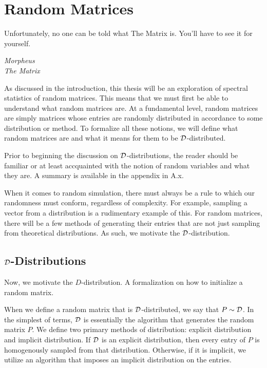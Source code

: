 
\chapter{Random Matrices}

\epigraph{Unfortunately, no one can be told what The Matrix is. You'll have to see it for yourself.}{\textit{Morpheus \\ The Matrix}}

As discussed in the introduction, this thesis will be an exploration of spectral statistics of random matrices. This means that we must first be able to understand what random matrices are. At a fundamental level, random matrices are simply matrices whose entries are randomly distributed in accordance to some distribution or method. To formalize all these notions, we will define what random matrices are and what it means for them to be $\D$-distributed.

Prior to beginning the discussion on $\D$-distributions, the reader should be familiar or at least accquainted with the notion of random variables and what they are. A summary is available in the appendix in A.x.

When it comes to random simulation, there must always be a rule to which our randomness must conform, regardless of complexity. For example, sampling a vector from a distribution is a rudimentary example of this. For random matrices, there will be a few methods of generating their entries that are not just sampling from theoretical distributions. As such, we motivate the $\D$-distribution.


\section{$\D$-Distributions}

Now, we motivate the $D$-distribution. A formalization on how to initialize a random matrix.

\begin{definition}[$\D$-distribution]
When we define a random matrix that is $\D$-distributed, we say that $P \sim \mathcal{D}$. In the simplest of terms, $\D$ is essentially the algorithm that generates the random matrix $P$. We define two primary methods of distribution: explicit distribution and implicit distribution. If $\D$ is an explicit distribution, then every entry of $P$ is homogenously sampled from that distribution. Otherwise, if it is implicit, we utilize an algorithm that imposes an implicit distribution on the entries.
\end{definition}

